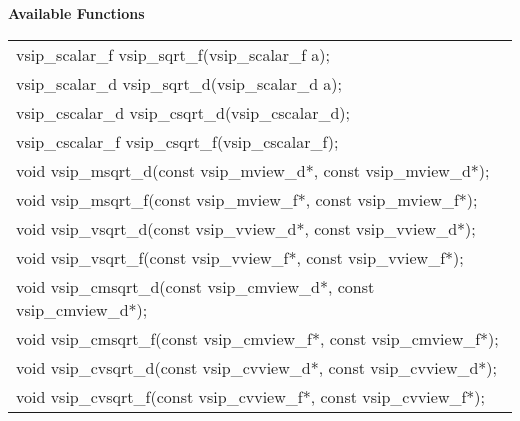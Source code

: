 \\\cvsiplh
\\ \hspace*{.8cm} \vspace*{.1cm} \textbf{Available Functions }
\\ \hspace*{1.1cm} {
\ttfamily
\begin{tabular}[H]{l}
vsip\_scalar\_f vsip\_sqrt\_f(vsip\_scalar\_f a);\\
vsip\_scalar\_d vsip\_sqrt\_d(vsip\_scalar\_d a);\\
vsip\_cscalar\_d vsip\_csqrt\_d(vsip\_cscalar\_d);\\
vsip\_cscalar\_f vsip\_csqrt\_f(vsip\_cscalar\_f);\\
void vsip\_msqrt\_d(const vsip\_mview\_d*, const vsip\_mview\_d*);\\
void vsip\_msqrt\_f(const vsip\_mview\_f*, const vsip\_mview\_f*);\\
void vsip\_vsqrt\_d(const vsip\_vview\_d*, const vsip\_vview\_d*);\\
void vsip\_vsqrt\_f(const vsip\_vview\_f*, const vsip\_vview\_f*);\\
void vsip\_cmsqrt\_d(const vsip\_cmview\_d*, const vsip\_cmview\_d*);\\
void vsip\_cmsqrt\_f(const vsip\_cmview\_f*, const vsip\_cmview\_f*);\\
void vsip\_cvsqrt\_d(const vsip\_cvview\_d*, const vsip\_cvview\_d*);\\
void vsip\_cvsqrt\_f(const vsip\_cvview\_f*, const vsip\_cvview\_f*);\\
\end{tabular}
}
\\\pyjvsiph
{}
